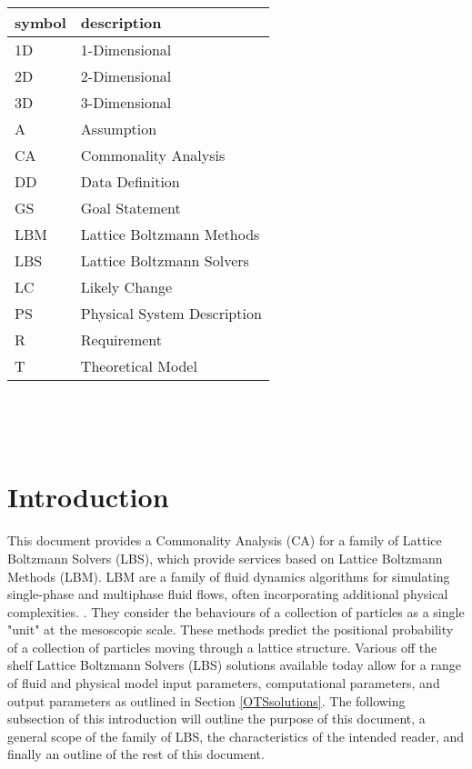 \documentclass[12pt]{article}
\begin{document}
\renewcommand{\arraystretch}{1.2}
\begin{tabular}{l l} 
  \toprule		
  \textbf{symbol} & \textbf{description}\\
  \midrule
  1D & 1-Dimensional\\ 
  2D & 2-Dimensional\\ 
  3D & 3-Dimensional\\ 
  A & Assumption\\
  CA & Commonality Analysis\\
  DD & Data Definition\\
  GS & Goal Statement\\
  LBM & Lattice Boltzmann Methods\\
  LBS & Lattice Boltzmann Solvers\\
  LC & Likely Change\\
  PS & Physical System Description\\
  R & Requirement\\
  T & Theoretical Model\\
  \bottomrule
\end{tabular}\\

\newpage

\tableofcontents

~\newpage


\section{Introduction}

This document provides a Commonality Analysis (CA) for a family of Lattice Boltzmann Solvers (LBS), which provide services based on Lattice Boltzmann Methods (LBM).
LBM are a family of fluid dynamics algorithms for simulating single-phase and multiphase fluid flows, often incorporating additional physical complexities. \citet{chen1998lattice}. They consider the behaviours of a collection of particles as a single "unit" at the mesoscopic scale. These methods predict the positional probability of a collection of particles moving through a lattice structure. Various off the shelf Lattice Boltzmann Solvers (LBS) solutions available today allow for a range of fluid and physical model input parameters, computational parameters, and output parameters as outlined in Section \ref{OTSsolutions}.
The following subsection of this introduction will outline the purpose of this document, a general scope of the family of LBS, the characteristics of the intended reader, and finally an outline of the rest of this document.
\end{document}
